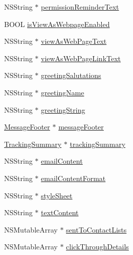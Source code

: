 \begin{DoxyCompactItemize}
\item 
N\-S\-String $\ast$ \hyperlink{interface_email_campaign_ada754b08af777a0bf43134d87568e593}{permission\-Reminder\-Text}
\item 
B\-O\-O\-L \hyperlink{interface_email_campaign_aeae122c1fa73e1707883764aed2e262f}{is\-View\-As\-Webpage\-Enabled}
\item 
N\-S\-String $\ast$ \hyperlink{interface_email_campaign_a1cc4071971230a238e0743074384e38a}{view\-As\-Web\-Page\-Text}
\item 
N\-S\-String $\ast$ \hyperlink{interface_email_campaign_a88af0c97288dafe250085fa07abfe248}{view\-As\-Web\-Page\-Link\-Text}
\item 
N\-S\-String $\ast$ \hyperlink{interface_email_campaign_ab92aeac1da9949764fc4de2efd955b56}{greeting\-Salutations}
\item 
N\-S\-String $\ast$ \hyperlink{interface_email_campaign_a5caea4bb5a8c3144b34ba7b61b475406}{greeting\-Name}
\item 
N\-S\-String $\ast$ \hyperlink{interface_email_campaign_a8c2be11acf58315a26e1016cd51ff7e7}{greeting\-String}
\item 
\hyperlink{interface_message_footer}{Message\-Footer} $\ast$ \hyperlink{interface_email_campaign_a4772d3418e667984de66395ebac53fbe}{message\-Footer}
\item 
\hyperlink{interface_tracking_summary}{Tracking\-Summary} $\ast$ \hyperlink{interface_email_campaign_a087ce0c24f9a20093302a430b4af0994}{tracking\-Summary}
\item 
N\-S\-String $\ast$ \hyperlink{interface_email_campaign_a4945ffab53d8957f547175a16ef36c9d}{email\-Content}
\item 
N\-S\-String $\ast$ \hyperlink{interface_email_campaign_a89709de7356ab4634b672dd2877a189c}{email\-Content\-Format}
\item 
N\-S\-String $\ast$ \hyperlink{interface_email_campaign_af011ebb60df9e39985c0d41f2fde27f0}{style\-Sheet}
\item 
N\-S\-String $\ast$ \hyperlink{interface_email_campaign_a11305c6bc1dbc38b75c1225b530bd8ba}{text\-Content}
\item 
N\-S\-Mutable\-Array $\ast$ \hyperlink{interface_email_campaign_ae9419aa69a528b574124f5e9cafe4b54}{sent\-To\-Contact\-Lists}
\item 
N\-S\-Mutable\-Array $\ast$ \hyperlink{interface_email_campaign_afe860013a6ad38aa0caef1292361527b}{click\-Through\-Details}
\end{DoxyCompactItemize}


